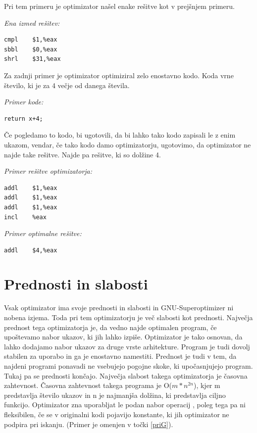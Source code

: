 \documentclass[a4paper, 12pt]{book}
\begin{document}
Pri tem primeru je optimizator našel enake rešitve kot v prejšnjem primeru.

\medskip

\noindent
{\it Ena izmed rešitev:}
\begin{Verbatim}[baselinestretch=1]
cmpl    $1,%eax
sbbl    $0,%eax
shrl    $31,%eax
\end{Verbatim}

Za zadnji primer je optimizator optimiziral zelo enostavno kodo. Koda vrne število, ki je za 4 večje od danega števila.

\medskip

\noindent
{\it Primer kode:}
\begin{Verbatim}[baselinestretch=1]
return x+4;
\end{Verbatim}

Če pogledamo to kodo, bi ugotovili, da bi lahko tako kodo zapisali le z enim ukazom, vendar, če tako kodo damo optimizatorju, ugotovimo, da optimizator ne najde take rešitve. Najde pa rešitve, ki so dolžine 4.

\medskip

\noindent
{\it Primer rešitve optimizatorja:}
\begin{Verbatim}[baselinestretch=1]
addl    $1,%eax
addl    $1,%eax
addl    $1,%eax
incl    %eax
\end{Verbatim}

\medskip

\noindent
{\it Primer optimalne rešitve:}
\begin{Verbatim}[baselinestretch=1]
addl    $4,%eax
\end{Verbatim}
	\section{Prednosti in slabosti}
	Vsak optimizator ima svoje prednosti in slabosti in GNU-Superoptimizer ni nobena izjema. Toda pri tem optimizatorju je več slabosti kot prednosti. Največja prednost tega optimizatorja je, da vedno najde optimalen program, če upoštevamo nabor ukazov, ki jih lahko izpiše. Optimizator je tako osnovan, da lahko dodajamo nabor ukazov za druge vrste arhitekture. Program je tudi dovolj stabilen za uporabo in ga je enostavno namestiti. Prednost je tudi v tem, da najdeni programi ponavadi ne vsebujejo pogojne skoke, ki upočasnjujejo program. Tukaj pa se prednosti končajo. Največja slabost takega optimizatorja je časovna zahtevnost. Časovna zahtevnost takega programa je O(\(m*n^{2n}\)), kjer m predstavlja število ukazov in n je najmanjša dolžina, ki predstavlja ciljno funkcijo. Optimizator zna uporabljat le podan nabor operacij \cite{pdf5}, poleg tega pa ni fleksibilen, če se v originalni kodi pojavijo konstante, ki jih optimizator ne podpira pri iskanju. (Primer je omenjen v točki \ref{priG}).
\end{document}

